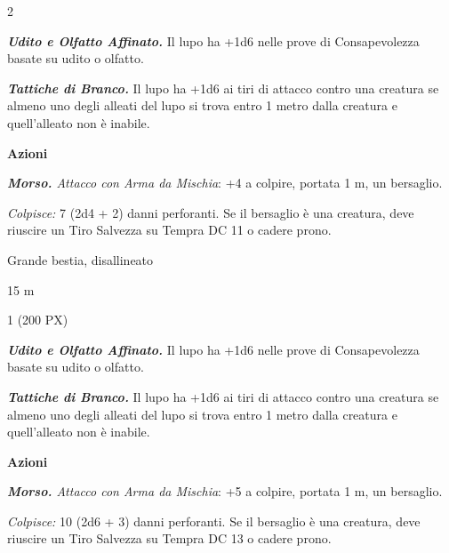 \begin{multicols}{2}
{\emph{\textbf{Udito e Olfatto Affinato.}} Il lupo ha +1d6 nelle prove di Consapevolezza basate su udito o olfatto.

\emph{\textbf{Tattiche di Branco.}} Il lupo ha +1d6 ai tiri di attacco contro una creatura se almeno uno degli alleati del lupo si trova entro 1 metro dalla creatura e quell'alleato non è inabile.

\textbf{Azioni}

\emph{\textbf{Morso.} Attacco con Arma da Mischia}: +4 a colpire, portata 1 m, un bersaglio.

\emph{Colpisce:} 7 (2d4 + 2) danni perforanti. Se il bersaglio è una creatura, deve riuscire un Tiro Salvezza su Tempra DC 11 o cadere prono.

\begin{description}[noitemsep, topsep=0pt, parsep=0pt, partopsep=0pt, itemsep=1pt, leftmargin=2.35cm,  labelwidth=2.2cm, itemindent=0cm, listparindent=0pt] %
\setlength{\baselineskip}{10pt}
\item[\textbf{Taglia/Tipo}] Grande bestia, disallineato
\item[\textbf{Caratt.}] 
\item[\textbf{Punti Ferita}] 
\item[\textbf{Tiri Salvez.}] 
\item[\textbf{Movimento}] 15 m
\item[\textbf{Sfida}] 1 (200 PX)
\end{description}
\smallskip

\emph{\textbf{Udito e Olfatto Affinato.}} Il lupo ha +1d6 nelle prove di Consapevolezza basate su udito o olfatto.

\emph{\textbf{Tattiche di Branco.}} Il lupo ha +1d6 ai tiri di attacco contro una creatura se almeno uno degli alleati del lupo si trova entro 1 metro dalla creatura e quell'alleato non è inabile.

\textbf{Azioni}

\emph{\textbf{Morso.} Attacco con Arma da Mischia}: +5 a colpire, portata 1 m, un bersaglio.

\emph{Colpisce:} 10 (2d6 + 3) danni perforanti. Se il bersaglio è una creatura, deve riuscire un Tiro Salvezza su Tempra DC 13 o cadere prono.

}
\end{multicols}
